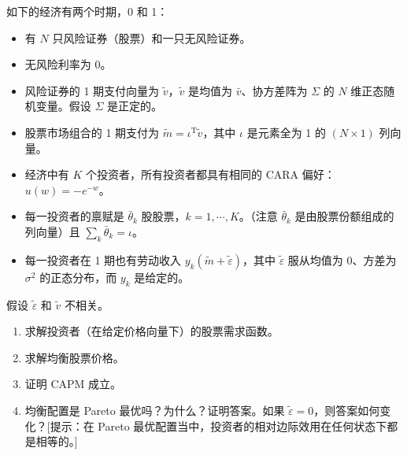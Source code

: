 
\begin{problem}
 如下的经济有两个时期，0 和 1：
\begin{itemize}
    \item 有 $N$ 只风险证券（股票）和一只无风险证券。
    \item 无风险利率为 0。
    \item 风险证券的 1 期支付向量为 $\tilde{v}$，$\tilde{v}$ 是均值为 $\bar{v}$、协方差阵为 $\Sigma$ 的 $N$ 维正态随机变量。假设 $\Sigma$ 是正定的。
    \item 股票市场组合的 1 期支付为 $\tilde{m}=\iota^{\mathrm{T}}\tilde{v}$，其中 $\iota$ 是元素全为 1 的 $(N\times 1)$ 列向量。
    \item 经济中有 $K$ 个投资者，所有投资者都具有相同的 CARA 偏好：$u(w)=-e^{-w}$。
    \item 每一投资者的禀赋是 $\bar{\theta}_{k}$ 股股票，$k=1,\cdots,K$。（注意 $\bar{\theta}_{k}$ 是由股票份额组成的列向量）且 $\sum_{k}\bar{\theta}_{k}=\iota$。
    \item 每一投资者在 1 期也有劳动收入 $y_{k}(\tilde{m}+\tilde{\varepsilon})$，其中 $\tilde{\varepsilon}$ 服从均值为 0、方差为 $\sigma^{2}$ 的正态分布，而 $y_{k}$ 是给定的。
\end{itemize}
假设 $\tilde{\varepsilon}$ 和 $\tilde{v}$ 不相关。
\begin{enumerate}[label=(\alph*)]
    \item 求解投资者（在给定价格向量下）的股票需求函数。
    \item 求解均衡股票价格。
    \item 证明 CAPM 成立。
    \item 均衡配置是 Pareto 最优吗？为什么？证明答案。如果 $\tilde{\varepsilon}=0$，则答案如何变化？[提示：在 Pareto 最优配置当中，投资者的相对边际效用在任何状态下都是相等的。]
\end{enumerate}
\end{problem}
